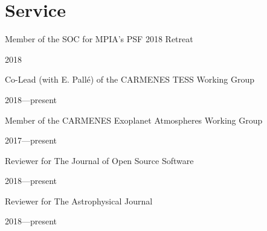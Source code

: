 \documentclass[11pt, a4paper]{article} %
\begin{document}
\section*{Service}

\begin{minipage}[t]{0.7\textwidth}
\begin{flushleft}%
  \setlength{\leftskip}{0.2cm}%
Member of the SOC for MPIA's PSF 2018 Retreat 
\end{flushleft}
\end{minipage}
\begin{minipage}[t]{0.3\textwidth}
\hfill 2018
\end{minipage}

\begin{minipage}[t]{0.7\textwidth}
\begin{flushleft}%
  \setlength{\leftskip}{0.2cm}%
Co-Lead (with E. Pall\'e) of the CARMENES TESS Working Group 
\end{flushleft}
\end{minipage}
\begin{minipage}[t]{0.3\textwidth}
\hfill 2018---present
\end{minipage}

\begin{minipage}[t]{0.7\textwidth}
\begin{flushleft}%
  \setlength{\leftskip}{0.2cm}%
Member of the CARMENES Exoplanet Atmospheres Working Group 
\end{flushleft}
\end{minipage}
\begin{minipage}[t]{0.3\textwidth}
\hfill 2017---present
\end{minipage}

\begin{minipage}[t]{0.7\textwidth}
\begin{flushleft}%
  \setlength{\leftskip}{0.2cm}%
Reviewer for The Journal of Open Source Software
\end{flushleft}
\end{minipage}
\begin{minipage}[t]{0.3\textwidth}
\hfill 2018---present
\end{minipage}

\begin{minipage}[t]{0.7\textwidth}
\begin{flushleft}%
  \setlength{\leftskip}{0.2cm}%
Reviewer for The Astrophysical Journal
\end{flushleft}
\end{minipage}
\begin{minipage}[t]{0.3\textwidth}
\hfill 2018---present
\end{minipage}
\end{document}
